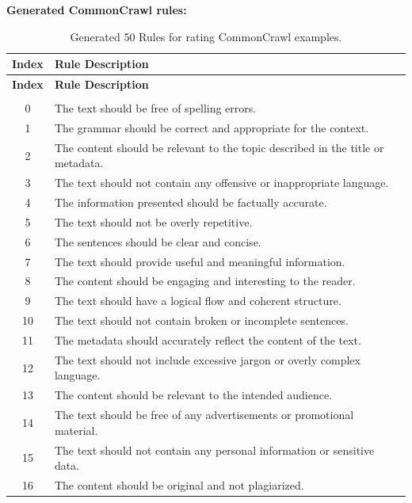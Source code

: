 \documentclass{article}
\newcommand{\mytiny}{\fontsize{8pt}{10pt}\selectfont}
\begin{document}
\textbf{Generated CommonCrawl rules:}

\begingroup
\mytiny
\begin{longtable}{c|p{14cm}} %
\hline
\textbf{Index} & \textbf{Rule Description} \\
\hline
\endfirsthead

\hline
\textbf{Index} & \textbf{Rule Description} \\
\hline
\endhead

\hline
\endfoot

\caption{Generated 50 Rules for rating CommonCrawl examples.} \label{tab:new-rules} \\
\endlastfoot

0 & The text should be free of spelling errors. \\
\hline
1 & The grammar should be correct and appropriate for the context. \\
\hline
2 & The content should be relevant to the topic described in the title or metadata. \\
\hline
3 & The text should not contain any offensive or inappropriate language. \\
\hline
4 & The information presented should be factually accurate. \\
\hline
5 & The text should not be overly repetitive. \\
\hline
6 & The sentences should be clear and concise. \\
\hline
7 & The text should provide useful and meaningful information. \\
\hline
8 & The content should be engaging and interesting to the reader. \\
\hline
9 & The text should have a logical flow and coherent structure. \\
\hline
10 & The text should not contain broken or incomplete sentences. \\
\hline
11 & The metadata should accurately reflect the content of the text. \\
\hline
12 & The text should not include excessive jargon or overly complex language. \\
\hline
13 & The content should be relevant to the intended audience. \\
\hline
14 & The text should be free of any advertisements or promotional material. \\
\hline
15 & The text should not contain any personal information or sensitive data. \\
\hline
16 & The content should be original and not plagiarized. \\

\end{longtable}
\end{document}
